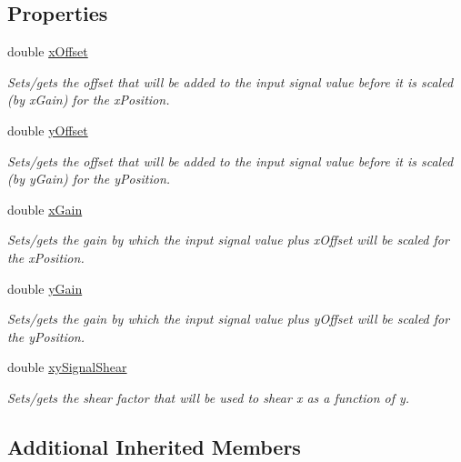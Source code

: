\subsection*{Properties}
\begin{DoxyCompactItemize}
\item 
double \hyperlink{class_picto_1_1_experiment_a0c8a2615fdcb36dc6ff76c572b718750}{x\-Offset}
\begin{DoxyCompactList}\small\item\em Sets/gets the offset that will be added to the input signal value before it is scaled (by x\-Gain) for the x\-Position. \end{DoxyCompactList}\item 
double \hyperlink{class_picto_1_1_experiment_a26e13838e01181ba7504742f4034336f}{y\-Offset}
\begin{DoxyCompactList}\small\item\em Sets/gets the offset that will be added to the input signal value before it is scaled (by y\-Gain) for the y\-Position. \end{DoxyCompactList}\item 
double \hyperlink{class_picto_1_1_experiment_acd2fd30373eb8c9050be4de8541a1576}{x\-Gain}
\begin{DoxyCompactList}\small\item\em Sets/gets the gain by which the input signal value plus x\-Offset will be scaled for the x\-Position. \end{DoxyCompactList}\item 
double \hyperlink{class_picto_1_1_experiment_a9200e0644a2c450dad16aaa59864fcf9}{y\-Gain}
\begin{DoxyCompactList}\small\item\em Sets/gets the gain by which the input signal value plus y\-Offset will be scaled for the y\-Position. \end{DoxyCompactList}\item 
double \hyperlink{class_picto_1_1_experiment_a46cb8ba580d801935254ab8c7d684c0b}{xy\-Signal\-Shear}
\begin{DoxyCompactList}\small\item\em Sets/gets the shear factor that will be used to shear x as a function of y. \end{DoxyCompactList}\end{DoxyCompactItemize}
\subsection*{Additional Inherited Members}


